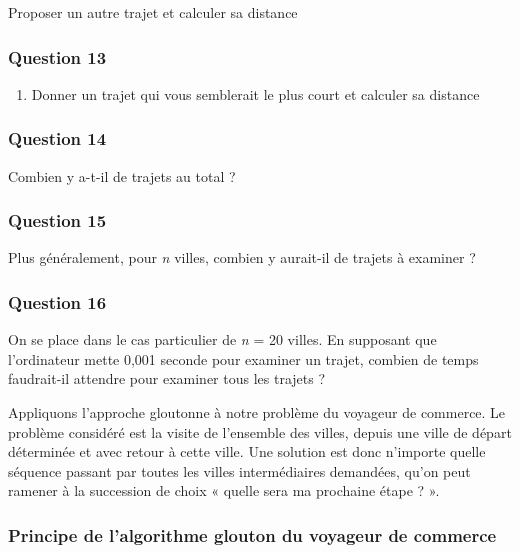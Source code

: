 \documentclass[
  paper=a4,
  ,captions=tableheading
]{scrartcl}
\providecommand{\tightlist}{%
  \setlength{\itemsep}{0pt}\setlength{\parskip}{0pt}}
\begin{document}
Proposer un autre trajet et calculer sa distance

\hypertarget{question-13}{%
\subsubsection{Question 13}\label{question-13}}

\begin{enumerate}
\tightlist
\item
  Donner un trajet qui vous semblerait le plus court et calculer sa
  distance
\end{enumerate}

\hypertarget{question-14}{%
\subsubsection{Question 14}\label{question-14}}

Combien y a-t-il de trajets au total ?

\hypertarget{question-15}{%
\subsubsection{Question 15}\label{question-15}}

Plus généralement, pour \emph{n} villes, combien y aurait-il de trajets
à examiner ?

\hypertarget{question-16}{%
\subsubsection{Question 16}\label{question-16}}

On se place dans le cas particulier de \emph{n} = 20 villes. En
supposant que l'ordinateur mette 0,001 seconde pour examiner un trajet,
combien de temps faudrait-il attendre pour examiner tous les trajets ?

Appliquons l'approche gloutonne à notre problème du voyageur de
commerce. Le problème considéré est la visite de l'ensemble des villes,
depuis une ville de départ déterminée et avec retour à cette ville. Une
solution est donc n'importe quelle séquence passant par toutes les
villes intermédiaires demandées, qu'on peut ramener à la succession de
choix « quelle sera ma prochaine étape ? ».

\hypertarget{principe-de-lalgorithme-glouton-du-voyageur-de-commerce}{%
\subsubsection{Principe de l'algorithme glouton du voyageur de
commerce}\label{principe-de-lalgorithme-glouton-du-voyageur-de-commerce}}
\end{document}

